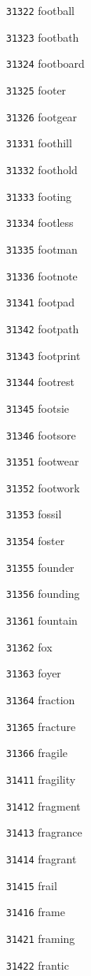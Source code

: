 \documentclass[twoside,11pt]{article}
\begin{document}
\begin{multicols}{5}
\begin{enumerate}
\item[\texttt{31322}] football
\item[\texttt{31323}] footbath
\item[\texttt{31324}] footboard
\item[\texttt{31325}] footer
\item[\texttt{31326}] footgear
\item[\texttt{31331}] foothill
\item[\texttt{31332}] foothold
\item[\texttt{31333}] footing
\item[\texttt{31334}] footless
\item[\texttt{31335}] footman
\item[\texttt{31336}] footnote
\item[\texttt{31341}] footpad
\item[\texttt{31342}] footpath
\item[\texttt{31343}] footprint
\item[\texttt{31344}] footrest
\item[\texttt{31345}] footsie
\item[\texttt{31346}] footsore
\item[\texttt{31351}] footwear
\item[\texttt{31352}] footwork
\item[\texttt{31353}] fossil
\item[\texttt{31354}] foster
\item[\texttt{31355}] founder
\item[\texttt{31356}] founding
\item[\texttt{31361}] fountain
\item[\texttt{31362}] fox
\item[\texttt{31363}] foyer
\item[\texttt{31364}] fraction
\item[\texttt{31365}] fracture
\item[\texttt{31366}] fragile
\item[\texttt{31411}] fragility
\item[\texttt{31412}] fragment
\item[\texttt{31413}] fragrance
\item[\texttt{31414}] fragrant
\item[\texttt{31415}] frail
\item[\texttt{31416}] frame
\item[\texttt{31421}] framing
\item[\texttt{31422}] frantic

\end{enumerate}
\end{multicols}
\end{document}
